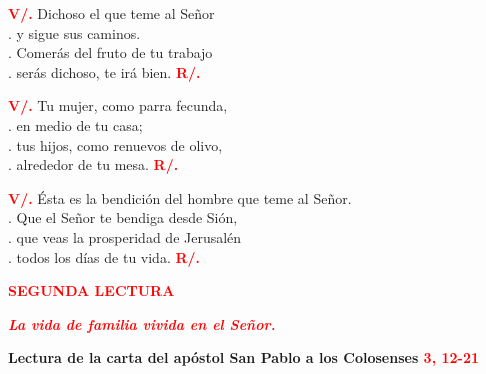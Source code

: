 \documentclass[12pt, letterpaper]{report}
\begin{document}
{\bfseries \textcolor{red}{V/.}} \hspace{1cm} Dichoso el que teme al Se\~nor\\
. \hspace{2.5cm} y sigue sus caminos.\\
. \hspace{2.5cm} Comer\'as del fruto de tu trabajo\\
. \hspace{2.5cm} ser\'as dichoso, te ir\'a bien.
\hspace{1cm} {\bfseries \textcolor{red}{R/.}}

{\bfseries \textcolor{red}{V/.}} \hspace{1cm} Tu mujer, como parra fecunda,\\
. \hspace{2.5cm} en medio de tu casa;\\
. \hspace{2.5cm} tus hijos, como renuevos de olivo,\\
. \hspace{2.5cm} alrededor de tu mesa.
\hspace{1cm} {\bfseries \textcolor{red}{R/.}}

{\bfseries \textcolor{red}{V/.}} \hspace{1cm} \'Esta es la bendici\'on del hombre que teme al Se\~nor.\\
. \hspace{2.5cm} Que el Se\~nor te bendiga desde Si\'on,\\
. \hspace{2.5cm} que veas la prosperidad de Jerusal\'en\\
. \hspace{2.5cm} todos los d\'ias de tu vida.
\hspace{1cm} {\bfseries \textcolor{red}{R/.}}

\begin{center}
\Large {\bfseries \textcolor{red}{SEGUNDA LECTURA}}
\end{center}

\begin{center}
\large {\bfseries \textit{ \textcolor{red}{La vida de familia vivida en el Se\~nor.}}}
\end{center}

\Large {\bfseries Lectura de la carta del ap\'ostol San Pablo a los Colosenses \hspace{1cm} \textcolor{red}{3, 12-21}}
\end{document}
